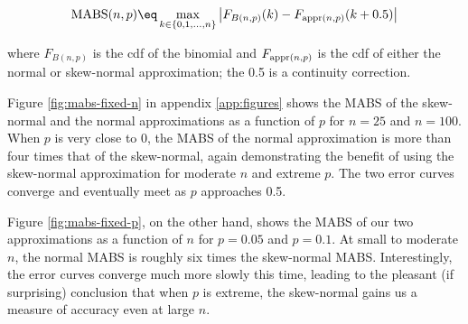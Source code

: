 \begin{equation}
  \textnormal{MABS}(n, p) \eq \max_{k \in \{0, 1,...,n\}} \left| F_{B(n,p)} (k) -  F_{\textnormal{appr}(n,p)}(k + 0.5) \right|
\end{equation}

where $F_{B(n,p)}$ is the cdf of the binomial and $F_{\textnormal{appr}(n,p)}$
is the cdf of either the normal or skew-normal approximation; the 0.5 is a
continuity correction.

Figure \ref{fig:mabs-fixed-n} in appendix \ref{app:figures} shows the MABS of
the skew-normal and the normal approximations as a function of $p$ for $n=25$
and $n=100$. When $p$ is very close to 0, the MABS of the normal approximation
is more than four times that of the skew-normal, again demonstrating the
benefit of using the skew-normal approximation for moderate $n$ and extreme
$p$. The two error curves converge and eventually meet as $p$ approaches 0.5.

Figure \ref{fig:mabs-fixed-p}, on the other hand, shows the MABS of our two
approximations as a function of $n$ for $p=0.05$ and $p=0.1$. At small to
moderate $n$, the normal MABS is roughly six times the skew-normal MABS.
Interestingly, the error curves converge much more slowly this time, leading to
the pleasant (if surprising) conclusion that when $p$ is extreme, the
skew-normal gains us a measure of accuracy even at large $n$.
